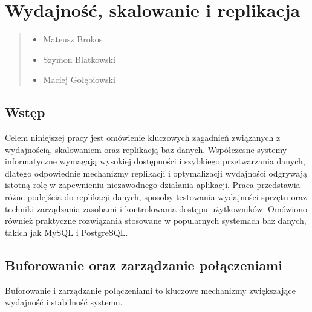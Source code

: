 \documentclass[letterpaper,10pt,polish]{sphinxmanual}
\begin{document}
\section{Wydajność, skalowanie i replikacja}
\label{\detokenize{rozdzial2/Wydajnosc_Skalowanie_i_Replikacja/index:wydajnosc-skalowanie-i-replikacja}}\label{\detokenize{rozdzial2/Wydajnosc_Skalowanie_i_Replikacja/index::doc}}\begin{quote}\begin{description}
\begin{itemize}
\item {} 
\sphinxAtStartPar
Mateusz Brokos

\item {} 
\sphinxAtStartPar
Szymon Blatkowski

\item {} 
\sphinxAtStartPar
Maciej Gołębiowski

\end{itemize}

\end{description}\end{quote}


\subsection{Wstęp}
\label{\detokenize{rozdzial2/Wydajnosc_Skalowanie_i_Replikacja/index:wstep}}
\sphinxAtStartPar
Celem niniejszej pracy jest omówienie kluczowych zagadnień związanych z wydajnością, skalowaniem oraz replikacją baz danych. Współczesne systemy informatyczne wymagają wysokiej dostępności i szybkiego przetwarzania danych, dlatego odpowiednie mechanizmy replikacji i optymalizacji wydajności odgrywają istotną rolę w zapewnieniu niezawodnego działania aplikacji. Praca przedstawia różne podejścia do replikacji danych, sposoby testowania wydajności sprzętu oraz techniki zarządzania zasobami i kontrolowania dostępu użytkowników. Omówiono również praktyczne rozwiązania stosowane w popularnych systemach baz danych, takich jak MySQL i PostgreSQL.


\subsection{Buforowanie oraz zarządzanie połączeniami}
\label{\detokenize{rozdzial2/Wydajnosc_Skalowanie_i_Replikacja/index:buforowanie-oraz-zarzadzanie-polaczeniami}}
\sphinxAtStartPar
Buforowanie i zarządzanie połączeniami to kluczowe mechanizmy zwiększające wydajność i stabilność systemu.
\end{document}
